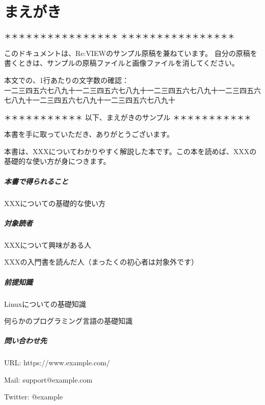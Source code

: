 \chapter{まえがき}
\label{chap:chap00-preface}

\begin{center}
＊＊＊＊＊＊＊＊＊＊＊＊＊＊＊＊  ＊＊＊＊＊＊＊＊＊＊＊＊＊＊＊＊
\end{center}

このドキュメントは、Re:VIEWのサンプル原稿を兼ねています。
自分の原稿を書くときは、サンプルの原稿ファイルと画像ファイルを消してください。

本文での、1行あたりの文字数の確認：\\{}
一二三四五六七八九十一二三四五六七八九十一二三四五六七八九十一二三四五六七八九十一二三四五六七八九十一二三四五六七八九十

\begin{center}
＊＊＊＊＊＊＊＊＊＊＊ 以下、まえがきのサンプル ＊＊＊＊＊＊＊＊＊＊＊\\{}
\end{center}

本書を手に取っていただき、ありがとうございます。

本書は、XXXについてわかりやすく解説した本です。この本を読めば、XXXの基礎的な使い方が身につきます。

\paragraph*{本書で得られること}
\label{sec:-0-0-0-1}

\begin{starteritemize}
\item XXXについての基礎的な使い方
\end{starteritemize}

\paragraph*{対象読者}
\label{sec:-0-0-0-2}

\begin{starteritemize}
\item XXXについて興味がある人
\item XXXの入門書を読んだ人（まったくの初心者は対象外です）
\end{starteritemize}

\paragraph*{前提知識}
\label{sec:-0-0-0-3}

\begin{starteritemize}
\item Linuxについての基礎知識
\item 何らかのプログラミング言語の基礎知識
\end{starteritemize}

\paragraph*{問い合わせ先}
\label{sec:-0-0-0-4}

\begin{starteritemize}
\item URL: https://www.example.com/
\item Mail: support@example.com
\item Twitter: @example
\end{starteritemize}
